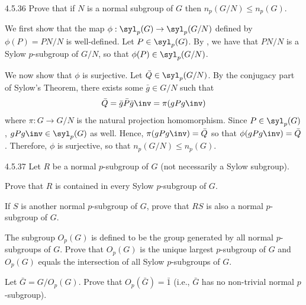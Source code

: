 \begin{exercise}{4.5.36}
	Prove that if $N$ is a normal subgroup of $G$ then $n_p(G/N) \leq n_p(G)$.
\end{exercise}

\begin{sol}
	We first show that the map $\phi : \syl_p(G) \to \syl_p(G/N)$ defined by $\phi(P) = PN/N$ is well-defined.
	Let $P \in \syl_p(G)$.
	By , we have that $PN/N$ is a Sylow $p$-subgroup of $G/N$, so that $\phi(P) \in \syl_p(G/N)$.

	We now show that $\phi$ is surjective.
	Let $\bar Q \in \syl_p(G/N)$.
	By the conjugacy part of Sylow's Theorem, there exists some $\bar g \in G/N$ such that
	\[
		\bar Q = \bar g\bar P\bar g\inv = \pi(gPg\inv)
	\]
	where $\pi : G \to G/N$ is the natural projection homomorphism.
	Since $P \in \syl_p(G)$, $gPg\inv \in \syl_p(G)$ as well.
	Hence, $\pi(gPg\inv) = \bar Q$ so that $\phi(gPg\inv) = \bar Q$.
	Therefore, $\phi$ is surjective, so that $n_p(G/N) \leq n_p(G)$.
\end{sol}

\begin{exercise}{4.5.37}
	Let $R$ be a normal $p$-subgroup of $G$ (not necessarily a Sylow subgroup).
	\begin{subexercises}
		\item Prove that $R$ is contained in every Sylow $p$-subgroup of $G$.
		\item If $S$ is another normal $p$-subgroup of $G$, prove that $RS$ is also a normal $p$-subgroup of $G$.
		\item The subgroup $O_p(G)$ is defined to be the group generated by all normal $p$-subgroups of $G$.
		Prove that $O_p(G)$ is the unique largest $p$-subgroup of $G$ and $O_p(G)$ equals the intersection of all Sylow $p$-subgroups of $G$.
		\item Let $\bar G = G/O_p(G)$.
		Prove that $O_p(\bar G) = \bar 1$ (i.e., $\bar G$ has no non-trivial normal $p$-subgroup).
	\end{subexercises}
\end{exercise}

